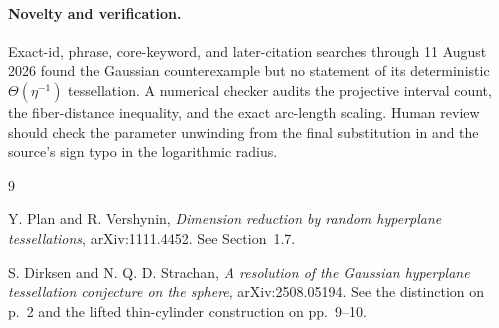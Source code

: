 \documentclass[11pt]{article}
\begin{document}
\paragraph{Novelty and verification.}
Exact-id, phrase, core-keyword, and later-citation searches through
11 August 2026 found the Gaussian counterexample but no statement of its
deterministic \(\Theta(\eta^{-1})\) tessellation.  A numerical checker audits
the projective interval count, the fiber-distance inequality, and the exact
arc-length scaling.  Human review should check the parameter unwinding from
the final substitution in \cite{ds} and the source's sign typo in the
logarithmic radius.

\begin{thebibliography}{9}
\raggedright
{}
Y. Plan and R. Vershynin,
\emph{Dimension reduction by random hyperplane tessellations},
arXiv:1111.4452.  See Section~1.7.

S. Dirksen and N. Q. D. Strachan,
\emph{A resolution of the Gaussian hyperplane tessellation conjecture on the
sphere}, arXiv:2508.05194.  See the distinction on p.~2 and the lifted
thin-cylinder construction on pp.~9--10.
\end{thebibliography}
\end{document}
